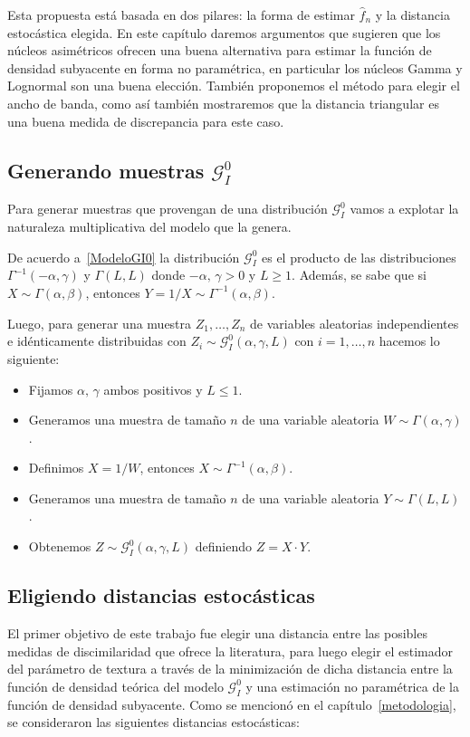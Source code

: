 Esta propuesta está basada en dos pilares: la forma de estimar $\widehat{f}_n$ y la distancia estocástica elegida. En este capítulo daremos argumentos que sugieren que los núcleos asimétricos ofrecen una buena alternativa para estimar la función de densidad subyacente en forma no paramétrica, en particular los núcleos Gamma y Lognormal son una buena elección. También proponemos el método para elegir el ancho de banda, como así también mostraremos que la distancia triangular es una buena medida de discrepancia para este caso.

\subsection{Generando muestras $\mathcal{G}_I^0$}

Para generar muestras que provengan de una distribución $\mathcal{G}_I^0$ vamos a explotar la naturaleza multiplicativa del modelo que la genera.

De acuerdo a~\ref{ModeloGI0} la distribución  $\mathcal{G}_I^0$ es el producto de las distribuciones $\Gamma^{-1}(-\alpha,\gamma)$ y $\Gamma(L,L)$ donde $-\alpha, \, \gamma >0$ y $L\geq 1$. Además, se sabe que si $X \sim \Gamma(\alpha,\beta)$, entonces $Y = 1/X \sim \Gamma^{-1}(\alpha,\beta)$.

Luego, para generar una muestra $Z_1, \ldots, Z_n$ de variables aleatorias independientes e idénticamente distribuidas con $Z_i \sim \mathcal{G}_I^0(\alpha,\gamma,L)$ con $i=1, \ldots, n$ hacemos lo siguiente:
\begin{itemize}
	\item Fijamos $\alpha, \, \gamma$ ambos positivos y $L \leq 1$.
	\item Generamos una muestra de tamaño $n$ de una variable aleatoria $W \sim \Gamma(\alpha,\gamma)$.
	\item Definimos $X=1/W$, entonces $X \sim \Gamma^{-1}(\alpha,\beta)$.
	\item Generamos una muestra de tamaño $n$ de una variable aleatoria $Y \sim \Gamma(L,L)$.
	\item Obtenemos $Z \sim \mathcal{G}_I^0(\alpha,\gamma,L)$ definiendo $Z=X \cdot Y$.
\end{itemize}


\subsection{Eligiendo distancias estocásticas}
\label{EligiendoDistancias}

El primer objetivo de este trabajo fue elegir una distancia entre las posibles medidas de discimilaridad que ofrece la literatura, para luego elegir el estimador del parámetro de textura a través de la minimización de dicha distancia entre la función de densidad teórica del modelo $\mathcal{G}_I^0$ y una estimación no paramétrica de la función de densidad subyacente. Como se mencionó en el capítulo~\ref{metodologia}, se consideraron las siguientes distancias estocásticas:

